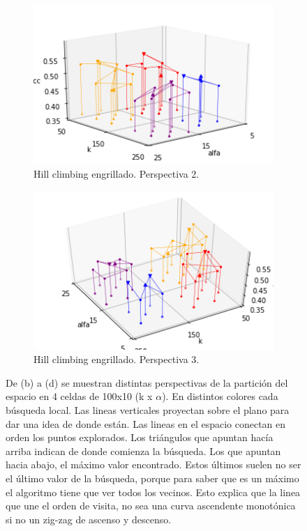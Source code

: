 \begin{figure}[ht]
\begin{subfigure}{.5\textwidth}
\begin{center}
      \includegraphics[width=1.0\textwidth]{./img/hillclimbing-2.png}
    \end{center}
    \caption{Hill climbing engrillado. Perspectiva 2.}
    \label{fig:hill-2}
  \end{subfigure}
  \begin{subfigure}{0.5\textwidth}
    \begin{center}
      \includegraphics[width=1.0\textwidth]{./img/hillclimbing-3.png}
    \end{center}
    \caption{Hill climbing engrillado. Perspectiva 3.}
    \label{fig:hill-3}
  \end{subfigure}
  \caption{De (b) a (d) se muestran distintas perspectivas de la
    partición del espacio en 4 celdas de 100x10 (k x $\alpha$). En
    distintos colores cada búsqueda local. Las lineas verticales
    proyectan sobre el plano para dar una idea de donde están. Las
    lineas en el espacio conectan en orden los puntos explorados. Los
    triángulos que apuntan hacía arriba indican de donde comienza la
    búsqueda. Los que apuntan hacia abajo, el máximo valor
    encontrado. Estos últimos suelen no ser el último valor de la
    búsqueda, porque para saber que es un máximo el algoritmo tiene
    que ver todos los vecinos. Esto explica que la linea que une el
    orden de visita, no sea una curva ascendente monotónica si no un
    zig-zag de ascenso y descenso.}
\end{figure}

